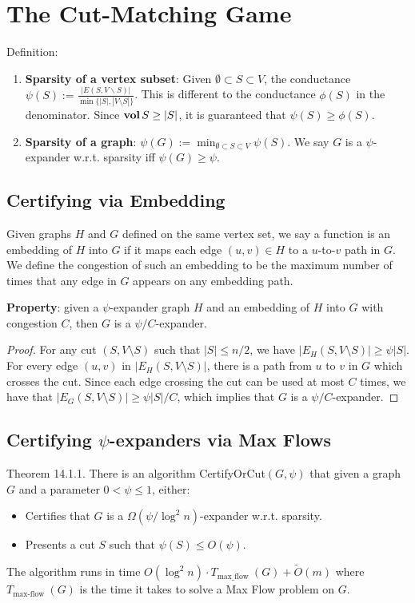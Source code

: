 \section{The Cut-Matching Game}
Definition:
\begin{enumerate}
    \item \textbf{Sparsity of a vertex subset}: Given $\emptyset \subset S \subset V$, the conductance $\psi(S) := \frac{|E(S, V \backslash S)|}{\min \{|S|, |V\setminus S|\}}$. This is different to the conductance $\phi(S)$ in the denominator. Since $\operatorname{\textbf{vol}}{S} \ge |S|$, it is guaranteed that $\psi(S) \ge \phi(S)$.
    \item \textbf{Sparsity of a graph}: $\psi(G):= \min_{\emptyset \subset S \subset V} \psi(S)$. We say $G$ is a $\psi$-expander w.r.t. sparsity iff $\psi(G) \ge \psi$.
\end{enumerate}

\subsection{Certifying via Embedding}

Given graphs $H$ and $G$ defined on the same vertex set, we say a function is an embedding of $H$ into $G$ if it maps each edge $(u,v) \in H$ to a $u$-to-$v$ path in $G$. We define the congestion of such an embedding to be the maximum number of times that any edge in $G$ appears on any embedding path.

\textbf{Property}: given a $\psi$-expander graph $H$ and an embedding of $H$ into $G$ with congestion $C$, then $G$ is a $\psi/C$-expander.
\begin{proof}
    For any cut $(S, V\setminus S)$ such that $|S|\le n/2$, we have $|E_H(S, V\setminus S)| \ge \psi |S|$. For every edge $(u,v)$ in $|E_H(S, V\setminus S)|$, there is a path from $u$ to $v$ in $G$ which crosses the cut. Since each edge crossing the cut can be used at most $C$ times, we have that $|E_G(S, V\setminus S)| \ge \psi |S|/C$, which implies that $G$ is a $\psi/C$-expander.
\end{proof}

\subsection{Certifying $\psi$-expanders via Max Flows}

Theorem 14.1.1. There is an algorithm CertifyOrCut$(G, \psi)$ that given a graph $G$ and a parameter $0<\psi \leq 1$, either:
\begin{itemize}
    \item Certifies that $G$ is a $\Omega\left(\psi / \log ^{2} n\right)$-expander w.r.t. sparsity.
    \item Presents a cut $S$ such that $\psi(S) \leq O(\psi)$.
\end{itemize}
The algorithm runs in time $O\left(\log^{2} n\right) \cdot T_{\text {max\_flow }}(G)+\tilde{O}(m)$ where $T_{\text{max-flow }}(G)$ is the time it takes to solve a Max Flow problem on $G$.


